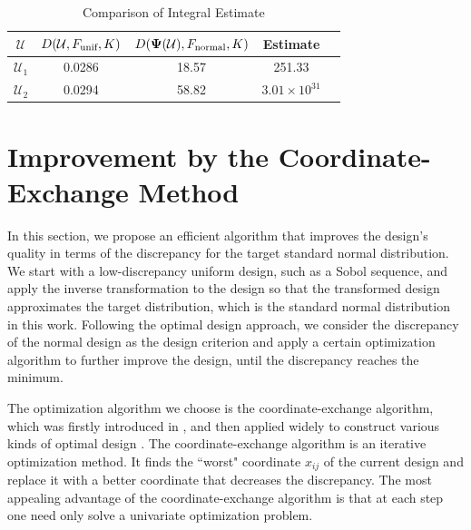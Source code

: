 \documentclass[graybox]{svmult}
\newcommand{\vPsi}{\boldsymbol{\Psi}}
\newcommand{\Udes}{\mathcal{U}}
\newcommand{\unif}{\textup{unif}}
\newcommand{\normal}{\textup{normal}}
\begin{document}
\begin{table}[htbp]
  \centering
  \caption{Comparison of Integral Estimate}
    \begin{tabular}{ccccc}
    \hline
   $\Udes$       & $D(\Udes,F_\unif, K)$     & $D(\vPsi(\Udes),F_\normal, K)$     & Estimate \\
    \hline
    $\Udes_1$     &   0.0286    &  18.57     & 251.33 \\
    $\Udes_2$     &  0.0294      &  58.82     & $3.01\times 10^{31}$ \\
    \hline
    \end{tabular}%
  \label{tab:badexample}%
\end{table}%

\section{Improvement by the Coordinate-Exchange Method}\label{sec:CoordEx}

In this section, we propose an efficient algorithm that improves the design's quality in terms of the discrepancy for the target standard normal distribution. 
We start with a low-discrepancy uniform design, such as a Sobol sequence, and apply the inverse transformation to the design so that the transformed design approximates the target distribution, which is the standard normal distribution in this work. 
Following the optimal design approach, we consider the discrepancy of the normal design as the design criterion and apply a certain optimization algorithm to further improve the design, until the discrepancy reaches the minimum.

The optimization algorithm we choose is the coordinate-exchange algorithm, which was firstly introduced in \cite{meyer1995coordinate}, and then applied widely to construct various kinds of optimal design \cite{sambo2014coordinate,overstall2017bayesian,kang2018stochastic}. 
The coordinate-exchange algorithm is an iterative optimization method.
It finds the ``worst" coordinate $x_{ij}$ of the current design and replace it with a better coordinate that decreases the discrepancy. 
The most appealing advantage of the coordinate-exchange algorithm is that at each step one need only solve a univariate optimization problem.
\end{document}
